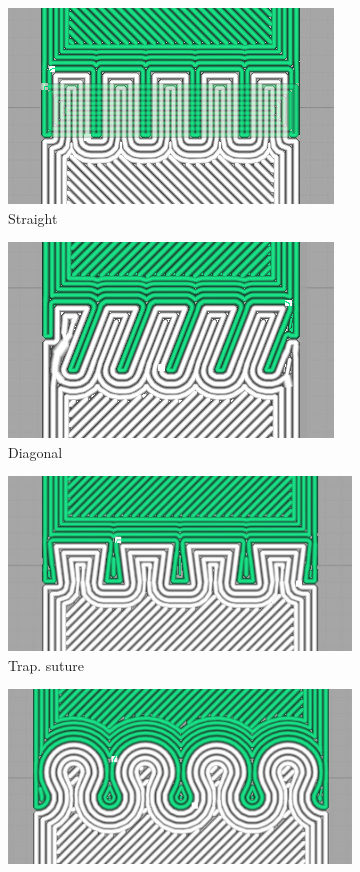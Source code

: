 \begin{figure}
	\setlength{\figheight}{.13\columnwidth}
	\centering
	\begin{subfigure}[B]{.2\columnwidth}
		\centering
		\includegraphics[height=\figheight]{sources/testing/straight_gcode.jpg}
		\caption{Straight}
		\label{fig:gcode_straight}
	\end{subfigure}
	\begin{subfigure}[B]{.2\columnwidth}
		\centering
		\includegraphics[height=\figheight]{sources/testing/diagonal_gcode.jpg}
		\caption{Diagonal}
		\label{fig:gcode_diagonal}
	\end{subfigure}
	\begin{subfigure}[B]{.24\columnwidth}
		\centering
		\includegraphics[height=\figheight]{sources/testing/suture_gcode.jpg}
		\caption{Trap. suture}
		\label{fig:gcode_suture}
	\end{subfigure}
	\begin{subfigure}[B]{.24\columnwidth}
		\centering
		\includegraphics[height=\figheight]{sources/testing/jigsaw_gcode.jpg}

\end{subfigure}
\end{figure}
